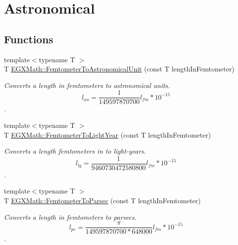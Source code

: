 \hypertarget{group___e_g_x_math-_conversions-_length_conversions-_s_i-_femtometer-_astronomical}{}\section{Astronomical}
\label{group___e_g_x_math-_conversions-_length_conversions-_s_i-_femtometer-_astronomical}
\subsection*{Functions}
\begin{DoxyCompactItemize}
\item 
{\footnotesize template$<$typename T $>$ }\\T \mbox{\hyperlink{group___e_g_x_math-_conversions-_length_conversions-_s_i-_femtometer-_astronomical_ga9c379bc2a0ed6ff83f0d545bab48e909}{E\+G\+X\+Math\+::\+Femtometer\+To\+Astronomical\+Unit}} (const T length\+In\+Femtometer)
\begin{DoxyCompactList}\small\item\em Converts a length in femtometers to astronomical units. \[ l_{au}= \frac{1}{149597870700} l_{fm} * 10^{-15} \]. \end{DoxyCompactList}\item 
{\footnotesize template$<$typename T $>$ }\\T \mbox{\hyperlink{group___e_g_x_math-_conversions-_length_conversions-_s_i-_femtometer-_astronomical_gaae002ed0894f79e0fa6889732d52e01d}{E\+G\+X\+Math\+::\+Femtometer\+To\+Light\+Year}} (const T length\+In\+Femtometer)
\begin{DoxyCompactList}\small\item\em Converts a length femtometers in to light-\/years. \[ l_{ly}= \frac{1}{9460730472580800} l_{fm} * 10^{-15} \]. \end{DoxyCompactList}\item 
{\footnotesize template$<$typename T $>$ }\\T \mbox{\hyperlink{group___e_g_x_math-_conversions-_length_conversions-_s_i-_femtometer-_astronomical_ga40144bb4cb7d474b9a22394a0f321faa}{E\+G\+X\+Math\+::\+Femtometer\+To\+Parsec}} (const T length\+In\+Femtometer)
\begin{DoxyCompactList}\small\item\em Converts a length in femtometers to parsecs. \[ l_{pc}=\frac{\pi}{149597870700 * 648000} l_{fm} * 10^{-15} \]. \end{DoxyCompactList}\end{DoxyCompactItemize}


